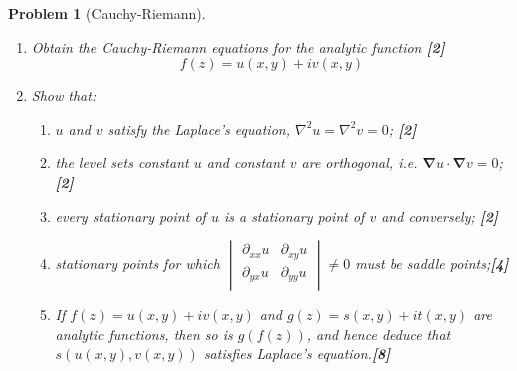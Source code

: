 \documentclass[a4paper]{article}
\theoremstyle{new}
\newtheorem{qns}{Problem}[section]
\begin{document}
\begin{qns}[Cauchy-Riemann]\leavevmode
\begin{enumerate}[label=(\alph*)]
    \item Obtain the Cauchy-Riemann equations for the analytic function \hfill \textbf{[2]}$$f(z)=u(x,y)+iv(x,y)$$
    \item Show that:
    \begin{enumerate}[label=(\roman*)]
        \item $u$ and $v$ satisfy the Laplace's equation, $\nabla^2u=\nabla^2v=0$; \hfill \textbf{[2]}
        \item the level sets constant $u$ and constant $v$ are orthogonal, i.e. $\boldsymbol{\nabla}u\cdot\boldsymbol{\nabla}v=0$; \hfill \textbf{[2]}
        \item every stationary point of $u$ is a stationary point of $v$ and conversely; \hfill \textbf{[2]}
        \item stationary points for which
        $\begin{vmatrix}\partial_{xx}u&\partial_{xy}u\\\partial_{yx}u&\partial_{yy}u\\\end{vmatrix}\neq0$ must be saddle points;\hfill \textbf{[4]}
    \item If $f(z)=u(x,y)+iv(x,y)$ and $g(z)=s(x,y)+it(x,y)$ are analytic functions, then so is $g(f(z))$, and hence deduce that $s(u(x,y),v(x,y))$ satisfies Laplace's equation.\hfill \textbf{[8]}
    \end{enumerate}
\end{enumerate}
\end{qns}
\end{document}
